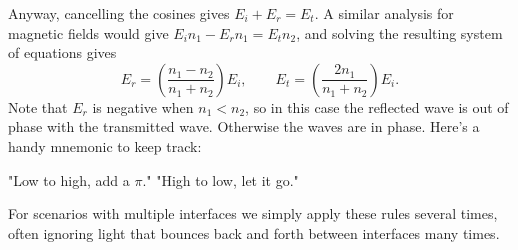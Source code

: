 \documentclass[../p051main.tex]{subfiles}
\begin{document}
Anyway, cancelling the cosines gives $E_i + E_r = E_t$.
A similar analysis for magnetic fields would give $E_i n_1 - E_r n_1 = E_t n_2$, and solving the resulting system of equations gives
\[ E_r = \left( \frac{n_1 - n_2}{n_1 + n_2} \right) E_i, \qquad E_t = \left( \frac{2n_1}{n_1 + n_2} \right) E_i.  \]
Note that $E_r$ is negative when $n_1 < n_2$, so in this case the reflected wave is out of phase with the transmitted wave.
Otherwise the waves are in phase.
Here's a handy mnemonic to keep track:
\begin{center}
    "Low to high, add a $\pi$." \qquad "High to low, let it go."
\end{center}
For scenarios with multiple interfaces we simply apply these rules several times, often ignoring light that bounces back and forth between interfaces many times.
\end{document}
